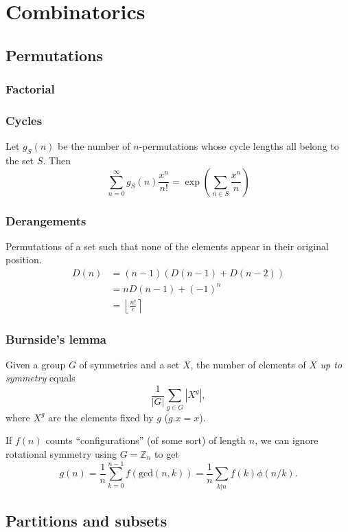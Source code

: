\chapter{Combinatorics}

\section{Permutations}
\subsection{Factorial}


\subsection{Cycles}
Let $g_S(n)$ be the number of $n$-permutations whose cycle lengths all belong
to the set $S$. Then $$\sum_{n=0} ^\infty g_S(n) \frac{x^n}{n!} =
   \exp\left(\sum_{n\in S} \frac{x^n} {n} \right)$$

\subsection{Derangements}
Permutations of a set such that none of the elements appear in their original
position.
\[
\begin{aligned}
   D(n) &= (n-1)(D(n-1) + D(n-2)) \\
        &= n D(n-1) + (-1)^n \\
        &= \left\lfloor \frac{n!}{e} \right\rceil
\end{aligned}
\]

\subsection{Burnside's lemma}
Given a group $G$ of symmetries and a set $X$, the number of elements of $X$
\emph{up to symmetry} equals
\[ {\frac {1}{|G|}}\sum _{{g\in G}}|X^{g}|, \]
where $X^{g}$ are the elements fixed by $g$ ($g.x = x$).

If $f(n)$ counts ``configurations'' (of some sort) of length $n$, we can ignore
rotational symmetry using $G = \mathbb Z_n$ to get
\[ g(n) = \frac 1 n \sum_{k=0}^{n-1}{f(\text{gcd}(n, k))} = \frac 1 n \sum_{k|n}{f(k)\phi(n/k)}. \]

\section{Partitions and subsets}
